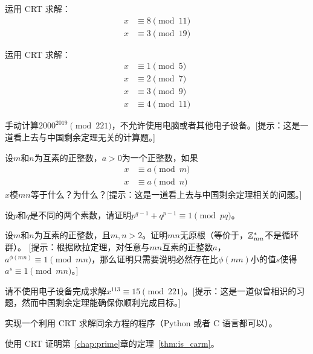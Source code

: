 \begin{problemset}

\item 运用 CRT 求解：
\begin{align*}
x &\equiv 8 \pmod{11}\\
x &\equiv 3 \pmod{19}
\end{align*}

\item 运用 CRT 求解：
				\begin{align*}
				x &\equiv 1\pmod{5}\\
				x &\equiv 2\pmod{7}\\
				x &\equiv 3\pmod{9}\\
				x &\equiv 4\pmod{11}
			\end{align*}
			
\item 手动计算$2000^{2019} \pmod{221}$，不允许使用电脑或者其他电子设备。[提示：这是一道看上去与中国剩余定理无关的计算题。]

\item 
\label{exe:four} 
设$m$和$n$为互素的正整数，$a>0$为一个正整数，如果
\begin{align*}
x &\equiv  a \pmod{m}\\
x &\equiv a \pmod{n}
\end{align*}
$x$模$mn$等于什么？为什么？[提示：这是一道看上去与中国剩余定理相关的问题。]%

\item 设$p$和$q$是不同的两个素数，请证明$p^{q-1} + q^{p-1} \equiv 1 \pmod{pq}$。

\item 设$m$和$n$为互素的正整数，且$m, n > 2$。证明$mn$无原根（等价于，${\mathbb Z}_{mn}^*$不是循环群）。
[提示：根据欧拉定理，对任意与$mn$互素的正整数$a$，
$a^{\phi(mn) }\equiv 1 \pmod{mn}$，那么证明只需要说明必然存在比$\phi(mn) $小的值$s$使得$a^s \equiv 1 \pmod{mn}$。]

\item 请不使用电子设备完成求解$x^{113} \equiv 15 \pmod{221}$。[提示：这是一道似曾相识的习题，然而中国剩余定理能确保你顺利完成目标。]

\item 实现一个利用 CRT 求解同余方程的程序（Python 或者 C 语言都可以）。

\item 使用 CRT 证明第~\ref{chap:prime}章的定理~\ref{thm:is_carm}。


\end{problemset}
